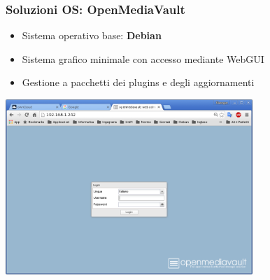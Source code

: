 \documentclass[11pt,xcolor=table]{beamer}
\begin{document}
\begin{frame}
	\frametitle{Soluzioni OS: OpenMediaVault}
	\begin{itemize}
		\item Sistema operativo base: \textbf{Debian}
		\item Sistema grafico minimale con accesso mediante WebGUI
		\item Gestione a pacchetti dei plugins e degli aggiornamenti
	\end{itemize}
	\centering
	\includegraphics[width=0.7\textwidth]{OMV/OMVscreen.png}
\end{frame}
\end{document}
